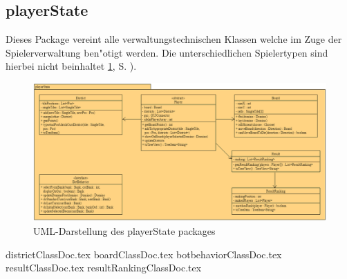 \subsection{playerState}
\label{ss:playerState}
\FloatBarrier

Dieses Package vereint alle verwaltungstechnischen Klassen welche im Zuge der Spielerverwaltung ben"otigt werden. Die unterschiedlichen Spielertypen sind hierbei nicht beinhaltet \ref{fig:playerStatePackage}, S. \pageref{fig:playerStatePackage}). 

\begin{figure}
	\centering
	\includegraphics[width=\linewidth]{pics/playerStatePackage}
	\caption{UML-Darstellung des playerState packages}
	\label{fig:playerStatePackage}
\end{figure}

{districtClassDoc.tex}
{boardClassDoc.tex}
{botbehaviorClassDoc.tex}
{resultClassDoc.tex}
{resultRankingClassDoc.tex}
